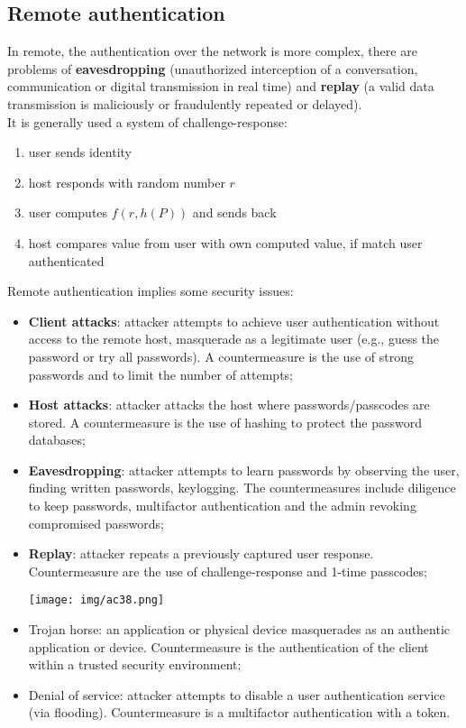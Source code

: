 \documentclass[a4paper, 10pt, titlepage]{article}
\begin{document}
\subsection{Remote authentication}
In remote, the authentication over the network is more complex, there are problems of \textbf{eavesdropping} (unauthorized interception of a conversation, communication or digital transmission in real time) and \textbf{replay} (a valid data transmission is maliciously or fraudulently repeated or delayed). \\
It is generally used a system of challenge-response:
\begin{enumerate}
\item user sends identity
\item host responds with random number $r$
\item user computes $f(r,h(P))$ and sends back
\item host compares value from user with own computed value, if match user authenticated
\end{enumerate}
Remote authentication implies some security issues:
\begin{itemize}
\item \textbf{Client attacks}: attacker attempts to achieve user authentication without access to the remote host, masquerade as a legitimate user (e.g., guess the password or try all passwords). A countermeasure is the use of strong passwords and to limit the number of attempts;
\item \textbf{Host attacks}: attacker attacks the host where passwords/passcodes are stored. A countermeasure is the use of hashing to protect the password databases;
\item \textbf{Eavesdropping}: attacker attempts to learn passwords by observing the user, finding written passwords, keylogging. The countermeasures include diligence to keep passwords, multifactor authentication and the admin revoking compromised passwords;
\item \textbf{Replay}: attacker repeats a previously captured user response. Countermeasure are the use of challenge-response and 1-time passcodes;
\begin{center}
\texttt{[image: img/ac38.png]}
\end{center}
\item Trojan horse: an application or physical device masquerades as an authentic application or device. Countermeasure is the authentication of the client within a trusted security environment;
\item Denial of service: attacker attempts to disable a user authentication service (via flooding). Countermeasure is a multifactor authentication with a token.
\end{itemize}
\end{document}
